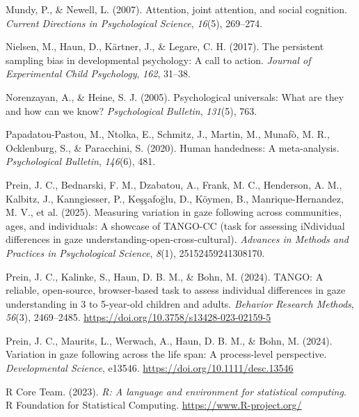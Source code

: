 \documentclass[
  man,floatsintext]{apa7}
\newlength{\cslhangindent}
\newenvironment{CSLReferences}[2] %
 {\begin{list}{}{%
  \setlength{\itemindent}{0pt}
  \setlength{\leftmargin}{0pt}
  \setlength{\parsep}{0pt}
  \ifodd #1
   \setlength{\leftmargin}{\cslhangindent}
   \setlength{\itemindent}{-1\cslhangindent}
  \fi
  \setlength{\itemsep}{#2\baselineskip}}}
 {\end{list}}
\begin{document}
\begin{CSLReferences}{1}{0}
Mundy, P., \& Newell, L. (2007). Attention, joint attention, and social cognition. \emph{Current Directions in Psychological Science}, \emph{16}(5), 269--274.

Nielsen, M., Haun, D., Kärtner, J., \& Legare, C. H. (2017). The persistent sampling bias in developmental psychology: A call to action. \emph{Journal of Experimental Child Psychology}, \emph{162}, 31--38.

Norenzayan, A., \& Heine, S. J. (2005). Psychological universals: What are they and how can we know? \emph{Psychological Bulletin}, \emph{131}(5), 763.

Papadatou-Pastou, M., Ntolka, E., Schmitz, J., Martin, M., Munafò, M. R., Ocklenburg, S., \& Paracchini, S. (2020). Human handedness: A meta-analysis. \emph{Psychological Bulletin}, \emph{146}(6), 481.

Prein, J. C., Bednarski, F. M., Dzabatou, A., Frank, M. C., Henderson, A. M., Kalbitz, J., Kanngiesser, P., Keşşafoğlu, D., Köymen, B., Manrique-Hernandez, M. V., et al. (2025). Measuring variation in gaze following across communities, ages, and individuals: A showcase of TANGO-CC (task for assessing iNdividual differences in gaze understanding-open-cross-cultural). \emph{Advances in Methods and Practices in Psychological Science}, \emph{8}(1), 25152459241308170.

Prein, J. C., Kalinke, S., Haun, D. B. M., \& Bohn, M. (2024). {TANGO}: {A} reliable, open-source, browser-based task to assess individual differences in gaze understanding in 3 to 5-year-old children and adults. \emph{Behavior Research Methods}, \emph{56}(3), 2469--2485. \url{https://doi.org/10.3758/s13428-023-02159-5}

Prein, J. C., Maurits, L., Werwach, A., Haun, D. B. M., \& Bohn, M. (2024). Variation in gaze following across the life span: {A} process-level perspective. \emph{Developmental Science}, e13546. \url{https://doi.org/10.1111/desc.13546}

R Core Team. (2023). \emph{R: A language and environment for statistical computing}. R Foundation for Statistical Computing. \url{https://www.R-project.org/}


\end{CSLReferences}
\end{document}
